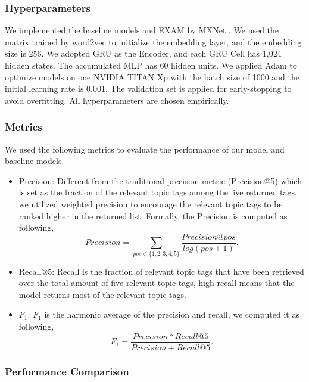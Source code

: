 \documentclass[letterpaper]{article} \usepackage{aaai19}  \usepackage{times}  \usepackage{helvet}  \usepackage{courier}  \usepackage{url}  \usepackage{graphicx}
\begin{document}
\subsubsection{Hyperparameters}
We implemented the baseline models and EXAM by MXNet \cite{MXNet}. We used the matrix trained by word2vec \cite{Word2vec} to initialize the embedding layer, and the embedding size is 256. We adopted GRU as the Encoder, and each GRU Cell has 1,024 hidden states. The accumulated MLP has 60 hidden units. We applied Adam \cite{adam} to optimize models on one NVIDIA TITAN Xp with the batch size of 1000 and the initial learning rate is 0.001. The validation set is applied for early-stopping to avoid overfitting. All hyperparameters are chosen empirically.
\subsubsection{Metrics}
We used the following metrics to evaluate the performance of our model and baseline models.


\begin{itemize}
\item Precision: Different from the traditional precision metric (Precision@5) which is set as the fraction of the relevant topic tags among the five returned tags, we utilized weighted precision to encourage the relevant topic tags to be ranked higher in the returned list. Formally, the Precision is computed as following,
\begin{equation}
Precision = \sum\limits_{pos \in \{1,2,3,4,5\}} \frac{Precision @ pos}{log(pos + 1)}.
\end{equation}
\item Recall@5: Recall is the fraction of relevant topic tags that have been retrieved over the total amount of five relevant topic tags,  high recall means that the model returns most of the relevant topic tags. 
\item $F_{1}$: $F_{1}$ is the harmonic average of the precision and recall, we computed it as following,
\begin{equation}
F_{1} = \frac{Precision * Recall@5}{Precision + Recall@5}. 
\end{equation}
\end{itemize}

\subsubsection{Performance Comparison}
\end{document}
